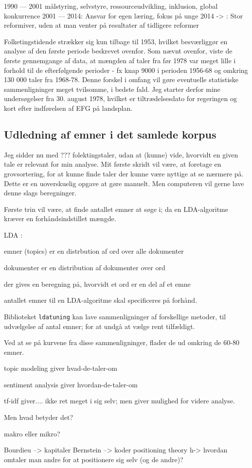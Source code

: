 1990 --- 2001 målstyring, selvstyre, ressourceudvikling, inklusion, global konkurrence 
2001 — 2014: Ansvar for egen læring, fokus på unge
2014 -> : Stor reformiver, uden at man venter på resultater af tidligere reformer

Folketingstidende strækker sig kun tilbage til 1953, hvilket besværliggør en analyse af den første periode beskrevet ovenfor.
Som nævnt ovenfor, viste de første gennemgange af data, at mængden af taler fra før 1978 var meget lille i forhold til de efterfølgende perioder - fx knap 9000 i perioden 1956-68 og omkring 130 000 taler fra 1968-78.
Denne forskel i omfang vil gøre eventuelle statistiske sammenligninger meget tvilsomme, i bedste fald.
Jeg starter derfor mine undersøgelser fra 30. august 1978, hvilket er tiltrædelsesdato for regeringen og kort efter indførelsen af EFG på landsplan.

\subsection{Udledning af emner i det samlede korpus}

Jeg sidder nu med ??? folektingstaler, udan at (kunne) vide, hvorvidt en given tale er relevant for min analyse.
Mit første skridt vil være, at foretage en grovsortering, for at kunne finde taler der kunne være nyttige at se nærmere på.
Dette er en uoverskuelig opgave at gøre manuelt.
Men computeren vil gerne lave denne slags beregninger.

Første trin vil være, at finde antallet emner at søge i; da en LDA-algoritme kræver en forhåndsindstillet mængde.

LDA \autocite{grunTopicmodelsPackageFitting2011}: 

emner (topics) er en distrbution af ord over alle dokumenter

dokumenter er en distribution af dokumenter over ord

der gives en beregning på, hvorvidt et ord er en del af et emne

antallet emner til en LDA-algoritme skal specificeres på forhånd.

Biblioteket \texttt{ldatuning} kan lave sammenligninger af forskellige metoder, til udvælgelse af antal emner; for at undgå at vælge rent tilfældigt.



Ved at se på kurvene fra disse sammenligninger, flader de ud omkring de 60-80 emner.

topic modeling giver hvad-de-taler-om

sentiment analysis giver hvordan-de-taler-om

tf-idf giver.... ikke ret meget i sig selv; men giver mulighed for videre analyse.

Men hvad betyder det?

makro eller mikro?

Bourdieu --> kapitaler
Bernstein --> koder
positioning theory h-> hvordan omtaler man andre for at positionere sig selv (og de andre)?
